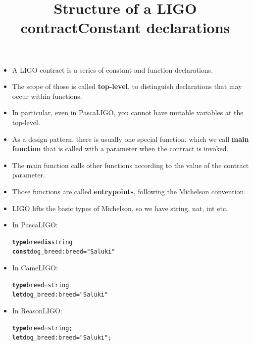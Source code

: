 \documentclass[wide]{slides}
\newcommand{\Kconst}[0]{\textbf{const}\xspace}
\newcommand{\Kis}[0]{\textbf{is}\xspace}
\newcommand{\Ktype}[0]{\textbf{type}\xspace}
\newcommand{\Klet}[0]{\textbf{let}\xspace}
\begin{document}
\begin{slide}
  \title{Structure of a LIGO contract}

  \begin{itemize}

    \item A LIGO contract is a series of constant and function
      declarations.

    \item The scope of those is called \textbf{top-level}, to
      distinguish declarations that may occur within functions.

    \item In particular, even in PascaLIGO, you cannot have mutable
      variables at the top-level.

    \item As a design pattern, there is usually one special function,
      which we call \textbf{main function} that is called with a
      parameter when the contract is invoked.

    \item The main function calls other functions according to the
      value of the contract parameter.

    \item Those functions are called \textbf{entrypoints}, following
      the Michelson convention.

  \end{itemize}

\end{slide}

\begin{slide}
  \title{Constant declarations}

  \begin{itemize}

    \item LIGO lifts the basic types of Michelson, so we have
      \textsf{string}, \textsf{nat}, \textsf{int} etc.

    \item In PascaLIGO:
      \begin{alltt}
\Ktype breed \Kis string
\Kconst dog\_breed : breed = "Saluki"
      \end{alltt}

    \item In CameLIGO:
      \begin{alltt}
\Ktype breed = string
\Klet dog\_breed : breed = "Saluki"
      \end{alltt}

    \item In ReasonLIGO:
      \begin{alltt}
\Ktype breed = string;
\Klet dog\_breed : breed = "Saluki";
      \end{alltt}

  \end{itemize}

\end{slide}
\end{document}
